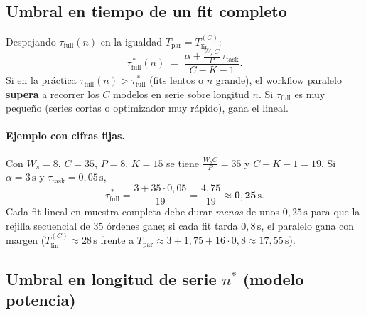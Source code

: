 \documentclass[11pt,a4paper]{article}
\begin{document}
\subsection{Umbral en tiempo de un fit completo}

Despejando $\tau_{\mathrm{full}}(n)$ en la igualdad $T_{\mathrm{par}} = T_{\mathrm{lin}}^{(C)}$:
\begin{equation}
  \label{eq:tau-star}
  \tau_{\mathrm{full}}^{\,*}(n)
  \;=\;
  \frac{\displaystyle \alpha + \frac{W_s\, C}{P}\,\tau_{\mathrm{task}}}
       {\,C - K - 1\,}.
\end{equation}
Si en la práctica $\tau_{\mathrm{full}}(n) > \tau_{\mathrm{full}}^{\,*}$ (fits
lentos o $n$ grande), el workflow paralelo \textbf{supera} a recorrer los $C$
modelos en serie sobre longitud $n$. Si $\tau_{\mathrm{full}}$ es muy pequeño
(series cortas o optimizador muy rápido), gana el lineal.

\paragraph{Ejemplo con cifras fijas.}
Con $W_s=8$, $C=35$, $P=8$, $K=15$ se tiene $\frac{W_s C}{P}=35$ y $C-K-1=19$.
Si $\alpha=3\,\mathrm{s}$ y $\tau_{\mathrm{task}}=0{,}05\,\mathrm{s}$,
\[
  \tau_{\mathrm{full}}^{\,*} = \frac{3 + 35\cdot 0{,}05}{19}
  = \frac{4{,}75}{19} \approx \mathbf{0{,}25\,\mathrm{s}}.
\]
Cada fit lineal en muestra completa debe durar \emph{menos} de unos $0{,}25\,\mathrm{s}$
para que la rejilla secuencial de $35$ órdenes gane; si cada fit tarda
$0{,}8\,\mathrm{s}$, el paralelo gana con margen ($T_{\mathrm{lin}}^{(C)}\approx 28\,\mathrm{s}$
frente a $T_{\mathrm{par}}\approx 3+1{,}75+16\cdot 0{,}8 \approx 17{,}55\,\mathrm{s}$).

\subsection{Umbral en longitud de serie \texorpdfstring{$n^{*}$}{n star} (modelo potencia)}
\end{document}
